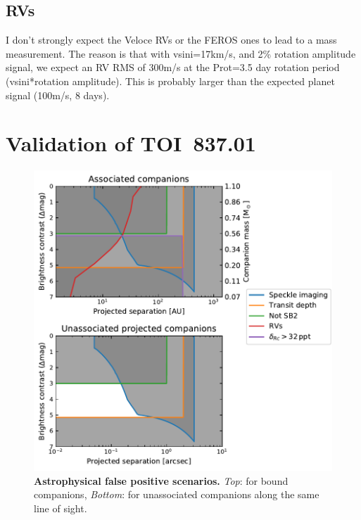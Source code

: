 \documentclass[12pt,twocolumn,tighten]{aastex62}
\newcommand{\pn}{TOI~837.01} %
\begin{document}
\subsection{RVs}
I don't strongly expect the Veloce RVs or the FEROS ones to lead to a
mass measurement. The reason is that with vsini=17km/s, and 2\%
rotation amplitude signal, we expect an RV RMS of 300m/s at the
Prot=3.5 day rotation period (vsini*rotation amplitude). This is
probably larger than the expected planet signal (100m/s, 8 days).



\section{Validation of \pn}
\label{subsec:validation}


\begin{figure}[t!]
	\begin{center}
		\leavevmode
		\includegraphics[width=1\textwidth]{f10.pdf}
	\end{center}
	\vspace{-0.7cm}
	\caption{
		{\bf Astrophysical false positive scenarios.}
		{\it Top}: for bound companions,
		{\it Bottom}: for unassociated companions along the same line of
		sight.
		\label{fig:fpscenario}
	}
\end{figure}
\end{document}
